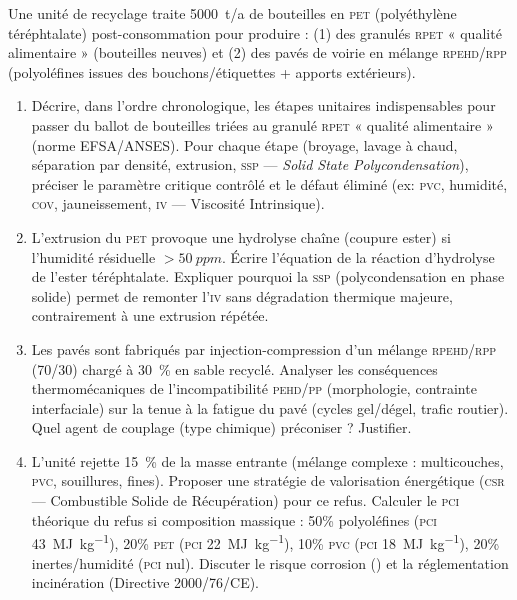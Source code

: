 \documentclass[11pt]{article}
\begin{document}
\begin{exercice}
Une unité de recyclage traite \SI{5000}{t/a} de bouteilles en \textsc{pet} (polyéthylène téréphtalate) post-consommation pour produire : (1) des granulés \textsc{rpet} « qualité alimentaire » (bouteilles neuves) et (2) des pavés de voirie en mélange \textsc{rpehd}/\textsc{rpp} (polyoléfines issues des bouchons/étiquettes + apports extérieurs).
\begin{enumerate}
    \item Décrire, dans l'ordre chronologique, les étapes unitaires indispensables pour passer du ballot de bouteilles triées au granulé \textsc{rpet} « qualité alimentaire » (norme EFSA/ANSES). Pour chaque étape (broyage, lavage à chaud, séparation par densité, extrusion, \textsc{ssp} — \textit{Solid State Polycondensation}), préciser le paramètre critique contrôlé et le défaut éliminé (ex: \textsc{pvc}, humidité, \textsc{cov}, jauneissement, \textsc{iv} — Viscosité Intrinsique).
    \item L'extrusion du \textsc{pet} provoque une hydrolyse chaîne (coupure ester) si l'humidité résiduelle $> \SI{50}{ppm}$. Écrire l'équation de la réaction d'hydrolyse de l'ester téréphtalate. Expliquer pourquoi la \textsc{ssp} (polycondensation en phase solide) permet de remonter l'\textsc{iv} sans dégradation thermique majeure, contrairement à une extrusion répétée.
    \item Les pavés sont fabriqués par injection-compression d'un mélange \textsc{rpehd}/\textsc{rpp} (70/30) chargé à \SI{30}{\%} en sable recyclé. Analyser les conséquences thermomécaniques de l'incompatibilité \textsc{pehd}/\textsc{pp} (morphologie, contrainte interfaciale) sur la tenue à la fatigue du pavé (cycles gel/dégel, trafic routier). Quel agent de couplage (type chimique) préconiser ? Justifier.
    \item L'unité rejette \SI{15}{\%} de la masse entrante (mélange complexe : multicouches, \textsc{pvc}, souillures, fines). Proposer une stratégie de valorisation énergétique (\textsc{csr} — Combustible Solide de Récupération) pour ce refus. Calculer le \textsc{pci} théorique du refus si composition massique : 50\% polyoléfines (\textsc{pci} \SI{43}{\mega\joule\per\kilo\gram}), 20\% \textsc{pet} (\textsc{pci} \SI{22}{\mega\joule\per\kilo\gram}), 10\% \textsc{pvc} (\textsc{pci} \SI{18}{\mega\joule\per\kilo\gram}), 20\% inertes/humidité (\textsc{pci} nul). Discuter le risque corrosion () et la réglementation incinération (Directive 2000/76/CE).
\end{enumerate}
\end{exercice}
\end{document}
